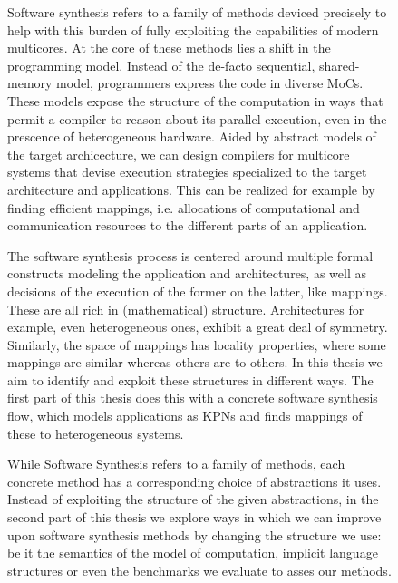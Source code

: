 \begin{figure}[h]
Software synthesis refers to a family of methods deviced precisely to help with this burden of fully exploiting the capabilities of modern multicores. At the core of these methods lies a shift in the programming model. Instead of the de-facto sequential, shared-memory model, programmers express the code in diverse \acp{MoC}. These models expose the structure of the computation in ways that permit a compiler to reason about its parallel execution, even in the prescence of heterogeneous hardware. Aided by abstract models of the target archicecture, we can design compilers for multicore systems that devise execution strategies specialized to the target architecture and applications. This can be realized for example by finding efficient mappings, i.e. allocations of computational and communication resources to the different parts of an application.

The software synthesis process is centered around multiple formal constructs modeling the application and architectures, as well as decisions of the execution of the former on the latter, like mappings.
These are all rich in (mathematical) structure. Architectures for example, even heterogeneous ones, exhibit a great deal of symmetry. Similarly, the space of mappings has locality properties, where some mappings are similar whereas others are to others. In this thesis we aim to identify and exploit these structures in different ways. The first part of this thesis does this with a concrete software synthesis flow, which models applications as \acp{KPN} and finds mappings of these to heterogeneous systems.

While Software Synthesis refers to a family of methods, each concrete method has a corresponding choice of abstractions it uses. Instead of exploiting the structure of the given abstractions, in the second part of this thesis we explore ways in which we can improve upon software synthesis methods by changing the structure we use: be it the semantics of the model of computation, implicit language structures or even the benchmarks we evaluate to asses our methods.


\end{figure}
